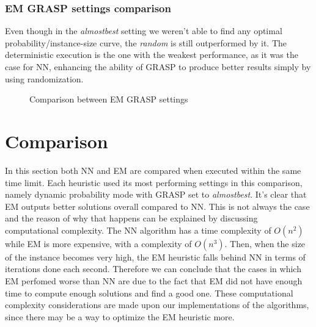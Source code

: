 \subsubsection{EM GRASP settings comparison}

Even though in the \textit{almostbest} setting we weren't able to find any optimal probability/instance-size curve, the \textit{random} is still outperformed by it.
The deterministic execution is the one with the weakest performance, as it was the case for NN, enhancing the ability of GRASP to produce better results simply by using randomization.

\begin{figure}[htbp]
	\centering
	\caption{Comparison between EM GRASP settings}
    \label{fig:emCmp}
\end{figure}

\section{Comparison}

In this section both NN and EM are compared when executed within the same time limit.
Each heuristic used its most performing settings in this comparison, namely dynamic probability mode with GRASP set to \textit{almostbest}.
It's clear that EM outputs better solutions overall compared to NN.
This is not always the case and the reason of why that happens can be explained by discussing computational complexity.
The NN algorithm has a time complexity of $O(n^2)$ while EM is more expensive, with a complexity of $O(n^3)$.
Then, when the size of the instance becomes very high, the EM heuristic falls behind NN in terms of iterations done each second.
Therefore we can conclude that the cases in which EM perfomed worse than NN are due to the fact that EM did not have enough time to compute enough solutions and find a good one.
These computational complexity considerations are made upon our implementations of the algorithms, since there may be a way to optimize the EM heuristic more.

